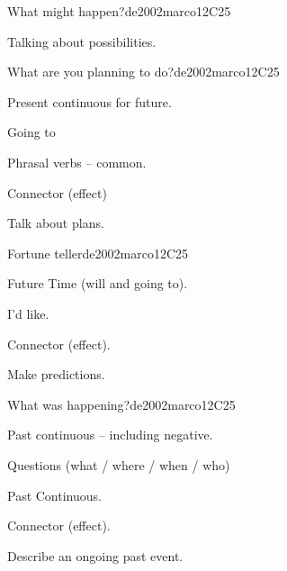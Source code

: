 \begin{syllabus}
\begin{unit}{What might happen?}{}{de2002marco}{12}{C25}
   \begin{learningoutcomes}
      \item Talking about possibilities.
   \end{learningoutcomes}
\end{unit}

\begin{unit}{What are you planning to do?}{}{de2002marco}{12}{C25}
   \begin{topics}
      \item Present continuous for future.
      \item Going to 
      \item Phrasal verbs – common.
      \item Connector (effect)
   \end{topics}

   \begin{learningoutcomes}
      \item Talk about plans.
   \end{learningoutcomes}
\end{unit}

\begin{unit}{Fortune teller}{}{de2002marco}{12}{C25}
   \begin{topics}
      \item Future Time (will and going to).
      \item I’d like.
      \item Connector (effect).
   \end{topics}

   \begin{learningoutcomes}
      \item Make predictions.
   \end{learningoutcomes}
\end{unit}

\begin{unit}{What was happening?}{}{de2002marco}{12}{C25}
   \begin{topics}
      \item Past continuous – including negative.
      \item Questions (what / where / when / who)
      \item Past Continuous.
      \item Connector (effect).
   \end{topics}

   \begin{learningoutcomes}
      \item Describe an ongoing past event.
   \end{learningoutcomes}
\end{unit}


\end{syllabus}
